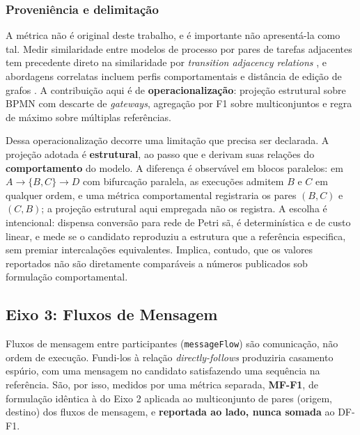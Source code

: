 \subsubsection*{Proveniência e delimitação}

A métrica não é original deste trabalho, e é importante não apresentá-la como tal. Medir similaridade entre modelos de processo por pares de tarefas adjacentes tem precedente direto na similaridade por \textit{transition adjacency relations} \cite{zha2010tar}, e abordagens correlatas incluem perfis comportamentais \cite{weidlich2011behavioral} e distância de edição de grafos \cite{dijkman2011similarity}. A contribuição aqui é de \textbf{operacionalização}: projeção estrutural sobre BPMN com descarte de \textit{gateways}, agregação por F1 sobre multiconjuntos e regra de máximo sobre múltiplas referências.

Dessa operacionalização decorre uma limitação que precisa ser declarada. A projeção adotada é \textbf{estrutural}, ao passo que  e  derivam suas relações do \textbf{comportamento} do modelo. A diferença é observável em blocos paralelos: em $A \rightarrow \{B, C\} \rightarrow D$ com bifurcação paralela, as execuções admitem $B$ e $C$ em qualquer ordem, e uma métrica comportamental registraria os pares $(B,C)$ e $(C,B)$; a projeção estrutural aqui empregada não os registra. A escolha é intencional: dispensa conversão para rede de Petri sã, é determinística e de custo linear, e mede se o candidato reproduziu a estrutura que a referência especifica, sem premiar intercalações equivalentes. Implica, contudo, que os valores reportados não são diretamente comparáveis a números publicados sob formulação comportamental.

\subsection{Eixo 3: Fluxos de Mensagem}
\label{subsec:eixo3}

Fluxos de mensagem entre participantes (\texttt{messageFlow}) são comunicação, não ordem de execução. Fundi-los à relação \textit{directly-follows} produziria casamento espúrio, com uma mensagem no candidato satisfazendo uma sequência na referência. São, por isso, medidos por uma métrica separada, \textbf{MF-F1}, de formulação idêntica à do Eixo 2 aplicada ao multiconjunto de pares (origem, destino) dos fluxos de mensagem, e \textbf{reportada ao lado, nunca somada} ao DF-F1.

